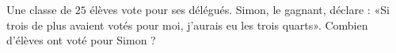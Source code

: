 
\begin{exercice}\label{exo2smath-0285}

    Une classe de \( 25\) élèves vote pour ses délégués. Simon, le gagnant, déclare : «Si trois de plus avaient votés pour moi, j'aurais eu les trois quarts». Combien d'élèves ont voté pour Simon ?

\end{exercice}
